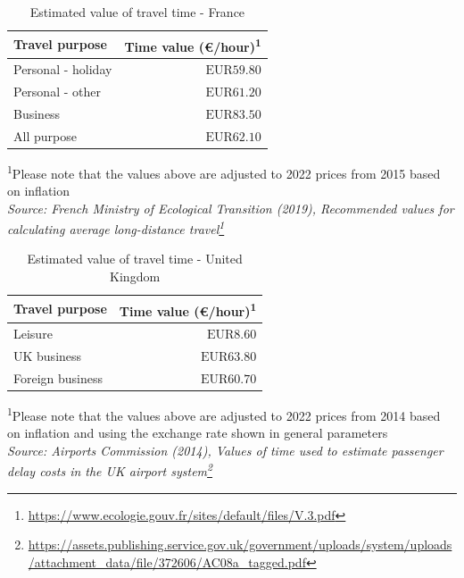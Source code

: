 \documentclass[
  11pt,
  a4paper,
]{book}
\DeclareRobustCommand{\href}[2]{#2\footnote{\url{#1}}}
\begin{document}
\hypertarget{tbl-pas-time-value-fr}{}
\setlength{\LTpost}{0mm}
\begin{longtable}{lr}
\caption{\label{tbl-pas-time-value-fr}Estimated value of travel time - France }\tabularnewline

\toprule
Travel purpose & Time value (€/hour)\textsuperscript{1} \\ 
\midrule
Personal - holiday & $\text{EUR}59.80$ \\ 
Personal - other & $\text{EUR}61.20$ \\ 
Business & $\text{EUR}83.50$ \\ 
All purpose & $\text{EUR}62.10$ \\ 
\bottomrule
\end{longtable}
\begin{minipage}{\linewidth}
\textsuperscript{1}Please note that the values above are adjusted to 2022 prices from 2015 based on inflation\\
\emph{Source: \href{https://www.ecologie.gouv.fr/sites/default/files/V.3.pdf}{French Ministry of Ecological Transition (2019), Recommended values for calculating average long-distance travel}}\\
\end{minipage}

\hypertarget{tbl-pas-time-value-uk}{}
\setlength{\LTpost}{0mm}
\begin{longtable}{lr}
\caption{\label{tbl-pas-time-value-uk}Estimated value of travel time - United Kingdom }\tabularnewline

\toprule
Travel purpose & Time value (€/hour)\textsuperscript{1} \\ 
\midrule
Leisure & $\text{EUR}8.60$ \\ 
UK business & $\text{EUR}63.80$ \\ 
Foreign business & $\text{EUR}60.70$ \\ 
\bottomrule
\end{longtable}
\begin{minipage}{\linewidth}
\textsuperscript{1}Please note that the values above are adjusted to 2022 prices from 2014 based on inflation and using the exchange rate shown in general parameters\\
\emph{Source: \href{https://assets.publishing.service.gov.uk/government/uploads/system/uploads/attachment_data/file/372606/AC08a_tagged.pdf}{Airports Commission (2014), Values of time used to estimate passenger delay costs in the UK airport system}}\\
\end{minipage}
\end{document}
